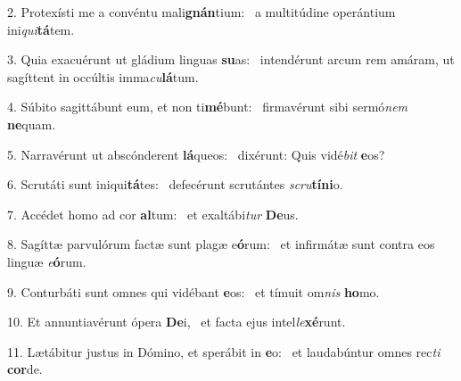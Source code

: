 2. Protexísti me a convéntu mali\textbf{gnán}tium: \ast\  a multitúdine operántium ini\textit{qui}\textbf{tá}tem.\

3. Quia exacuérunt ut gládium linguas \textbf{su}as: \ast\  intendérunt arcum rem amáram, ut sagíttent in occúltis imma\textit{cu}\textbf{lá}tum.\

4. Súbito sagittábunt eum, et non ti\textbf{mé}bunt: \ast\  firmavérunt sibi sermó\textit{nem} \textbf{ne}quam.\

5. Narravérunt ut abscónderent \textbf{lá}queos: \ast\  dixérunt: Quis vidé\textit{bit} \textbf{e}os?\

6. Scrutáti sunt iniqui\textbf{tá}tes: \ast\  defecérunt scrutántes \textit{scru}\textbf{tí}\textbf{ni}o.\

7. Accédet homo ad cor \textbf{al}tum: \ast\  et exaltábi\textit{tur} \textbf{De}us.\

8. Sagíttæ parvulórum factæ sunt plagæ e\textbf{ó}rum: \ast\  et infirmátæ sunt contra eos linguæ \textit{e}\textbf{ó}rum.\

9. Conturbáti sunt omnes qui vidébant \textbf{e}os: \ast\  et tímuit om\textit{nis} \textbf{ho}mo.\

10. Et annuntiavérunt ópera \textbf{De}i, \ast\  et facta ejus intel\textit{le}\textbf{xé}runt.\

11. Lætábitur justus in Dómino, et sperábit in \textbf{e}o: \ast\  et laudabúntur omnes rec\textit{ti} \textbf{cor}de.\

